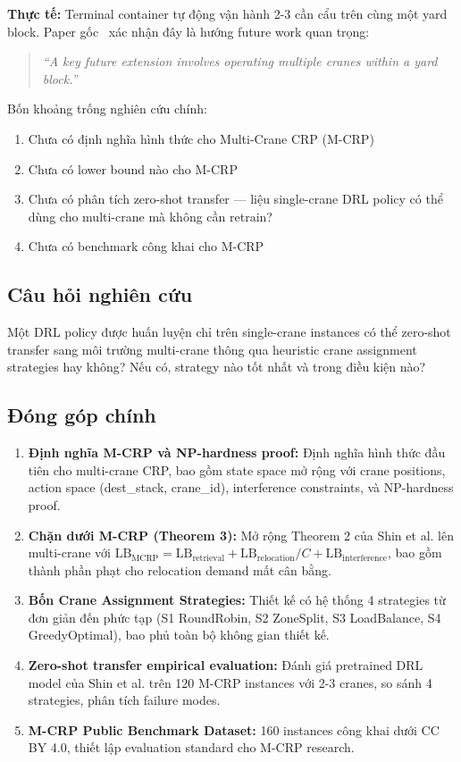\documentclass[11pt,a4paper]{article}
\theoremstyle{definition}
\newcommand{\1}{\mathbbm{1}}
\begin{document}
\textbf{Thực tế:} Terminal container tự động vận hành 2-3 cần cẩu trên cùng một yard block. Paper gốc~\cite{shin2026} xác nhận đây là hướng future work quan trọng:
\begin{quote}
\textit{``A key future extension involves operating multiple cranes within a yard block.''}
\end{quote}

Bốn khoảng trống nghiên cứu chính:
\begin{enumerate}
    \item Chưa có định nghĩa hình thức cho Multi-Crane CRP (M-CRP)
    \item Chưa có lower bound nào cho M-CRP
    \item Chưa có phân tích zero-shot transfer — liệu single-crane DRL policy có thể dùng cho multi-crane mà không cần retrain?
    \item Chưa có benchmark công khai cho M-CRP
\end{enumerate}

\subsection{Câu hỏi nghiên cứu}

Một DRL policy được huấn luyện chỉ trên single-crane instances có thể zero-shot transfer sang môi trường multi-crane thông qua heuristic crane assignment strategies hay không? Nếu có, strategy nào tốt nhất và trong điều kiện nào?

\subsection{Đóng góp chính}

\begin{enumerate}
    \item[{[C1]}] \textbf{Định nghĩa M-CRP và NP-hardness proof:} Định nghĩa hình thức đầu tiên cho multi-crane CRP, bao gồm state space mở rộng với crane positions, action space (dest\_stack, crane\_id), interference constraints, và NP-hardness proof.
    \item[{[C2]}] \textbf{Chặn dưới M-CRP (Theorem 3):} Mở rộng Theorem 2 của Shin et al. lên multi-crane với $\text{LB}_{\text{MCRP}} = \text{LB}_{\text{retrieval}} + \text{LB}_{\text{relocation}} / C + \text{LB}_{\text{interference}}$, bao gồm thành phần phạt cho relocation demand mất cân bằng.
    \item[{[C3]}] \textbf{Bốn Crane Assignment Strategies:} Thiết kế có hệ thống 4 strategies từ đơn giản đến phức tạp (S1 RoundRobin, S2 ZoneSplit, S3 LoadBalance, S4 GreedyOptimal), bao phủ toàn bộ không gian thiết kế.
    \item[{[C4]}] \textbf{Zero-shot transfer empirical evaluation:} Đánh giá pretrained DRL model của Shin et al. trên 120 M-CRP instances với 2-3 cranes, so sánh 4 strategies, phân tích failure modes.
    \item[{[C5]}] \textbf{M-CRP Public Benchmark Dataset:} 160 instances công khai dưới CC BY 4.0, thiết lập evaluation standard cho M-CRP research.
\end{enumerate}
\end{document}
